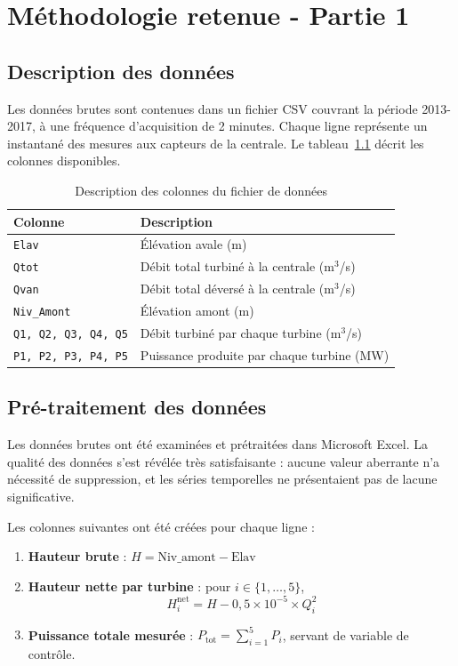 \documentclass[12pt, letterpaper]{report}
\begin{document}
\chapter{Méthodologie retenue - Partie 1}

\section{Description des données}

Les données brutes sont contenues dans un fichier CSV couvrant la période 2013-2017, à une fréquence d'acquisition de 2 minutes. Chaque ligne représente un instantané des mesures aux capteurs de la centrale. Le tableau~\ref{tab:colonnes} décrit les colonnes disponibles.

\begin{table}[H]
  \centering
  \caption{Description des colonnes du fichier de données}
  \label{tab:colonnes}
  \begin{tabular}{ll}
    \toprule
    Colonne & Description \\
    \midrule
    \texttt{Elav}             & Élévation avale (m) \\
    \texttt{Qtot}             & Débit total turbiné à la centrale (m$^3$/s) \\
    \texttt{Qvan}             & Débit total déversé à la centrale (m$^3$/s) \\
    \texttt{Niv\_Amont}       & Élévation amont (m) \\
    \texttt{Q1, Q2, Q3, Q4, Q5} & Débit turbiné par chaque turbine (m$^3$/s) \\
    \texttt{P1, P2, P3, P4, P5} & Puissance produite par chaque turbine (MW) \\
    \bottomrule
  \end{tabular}
\end{table}

\section{Pré-traitement des données}

Les données brutes ont été examinées et prétraitées dans Microsoft Excel. La qualité des données s'est révélée très satisfaisante : aucune valeur aberrante n'a nécessité de suppression, et les séries temporelles ne présentaient pas de lacune significative.

Les colonnes suivantes ont été créées pour chaque ligne :

\begin{enumerate}
  \item \textbf{Hauteur brute} : $H = \text{Niv\_amont} - \text{Elav}$
  \item \textbf{Hauteur nette par turbine} : pour $i \in \{1,\ldots,5\}$,
    \begin{equation}
      H_i^{\text{net}} = H - 0{,}5 \times 10^{-5} \times Q_i^2
    \end{equation}
  \item \textbf{Puissance totale mesurée} : $P_{\text{tot}} = \sum_{i=1}^{5} P_i$, servant de variable de contrôle.
\end{enumerate}
\end{document}
